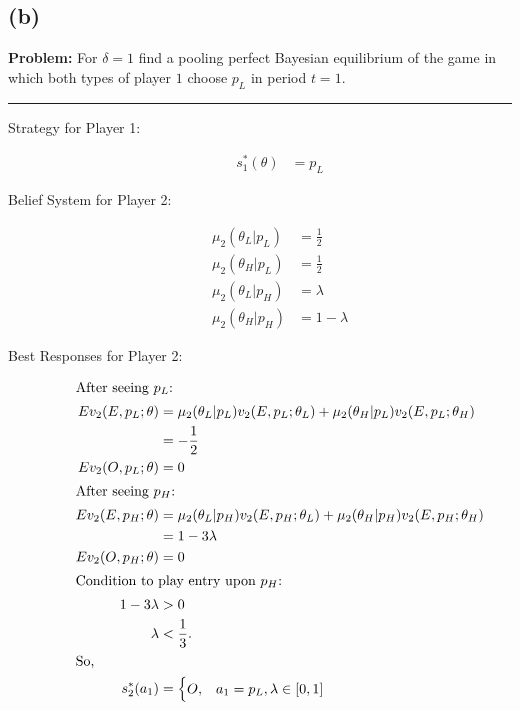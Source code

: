 \documentclass[10pt]{extarticle}
\begin{document}
  \subsection{(b)}%
  \textbf{Problem:} For $\delta = 1$ find a pooling perfect Bayesian equilibrium of the game in which both types of player $1$ choose $p_L$ in period $t=1$.
  \begin{center}
  \rule{\textwidth}{0.4pt}
  \end{center}
    \begin{description}
      \item[Strategy for Player 1:]
        \begin{align*}
          s_1^{\ast}(\theta)&= p_L \tag*{$\forall \theta$}
        \end{align*}
      \item[Belief System for Player 2:]
        \begin{align*}
          \mu_{2}(\theta_L | p_L) &= \frac{1}{2}\\
          \mu_2(\theta_H|p_L) &= \frac{1}{2}\\
          \mu_2(\theta_L|p_H) &= \lambda\\
          \mu_2(\theta_H|p_H) &= 1-\lambda
        \end{align*}
      \item[Best Responses for Player 2:]
        \begin{align*}
          \shortintertext{After seeing $p_L$:}
          Ev_2(E,p_L;\theta) &= \mu_{2}(\theta_L | p_L)v_2(E,p_L;\theta_L) + \mu_{2}(\theta_H | p_L)v_2(E,p_L;\theta_H)\\
                             &=-\frac{1}{2}\\
           Ev_2(O,p_L;\theta) &= 0\\
           \shortintertext{After seeing $p_H$:}
           Ev_2(E,p_H;\theta) &= \mu_{2}(\theta_L | p_H)v_2(E,p_H;\theta_L) + \mu_{2}(\theta_H | p_H)v_2(E,p_H;\theta_H)\\
                              &= 1-3\lambda\\
           Ev_2(O,p_H;\theta) &= 0\\
           \shortintertext{Condition to play entry upon $p_H$:}
           1-3\lambda &> 0\\
           \lambda &< \frac{1}{3}.\\
           \shortintertext{So,}
           s_2^{\ast}(a_1) &= \begin{cases}
             O,&a_1 = p_L,\lambda\in[0,1]\\

\end{cases}
\end{align*}
\end{description}
\end{document}

